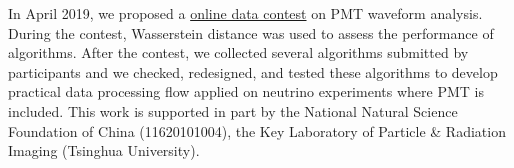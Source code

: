 \acknowledgments
In April 2019, we proposed a \href{https://mp.weixin.qq.com/s?__biz=MzA4MTAwMzgzOA==&mid=2650872289&idx=2&sn=48145a6598545d201f940e0459de99dd&chksm=846e2db0b319a4a627e902d0d6ed4b9d968225566021342c5935764963f352fbe02db1bdb333&mpshare=1&scene=1&srcid=0307c4HOvK0ChJUcq9blC3ub%23rd}{online data contest} on PMT waveform analysis. During the contest, Wasserstein distance was used to assess the performance of algorithms. After the contest, we collected several algorithms submitted by participants and we checked, redesigned, and tested these algorithms to develop practical data processing flow applied on neutrino experiments where PMT is included. This work is supported in part by the National Natural Science Foundation of China (11620101004), the Key Laboratory of Particle \& Radiation Imaging (Tsinghua University). 

